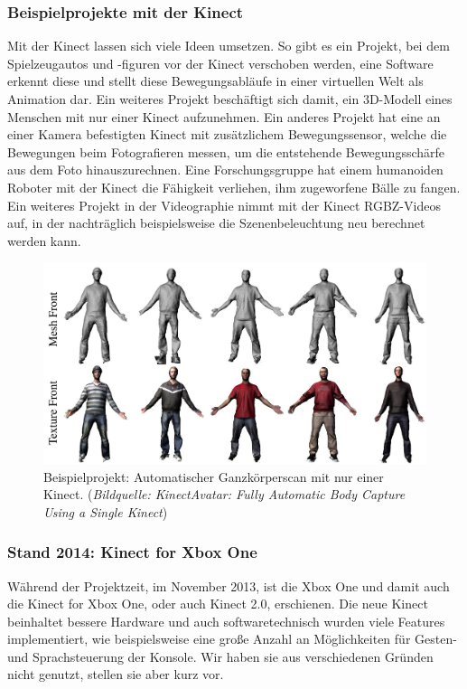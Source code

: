 \documentclass[12pt,a4paper,ngerman]{scrartcl}
\begin{document}
\subsubsection{Beispielprojekte mit der Kinect}

Mit der Kinect lassen sich viele Ideen umsetzen. So gibt es ein Projekt, bei dem Spielzeugautos und
-figuren vor der Kinect verschoben werden, eine Software erkennt diese und stellt diese Bewegungsabläufe
in einer virtuellen Welt als Animation dar.\cite{3dpuppetry} Ein weiteres Projekt beschäftigt sich
damit, ein 3D-Modell eines Menschen mit nur einer Kinect aufzunehmen.\cite{kinectavatar} Ein anderes Projekt hat eine an einer Kamera
befestigten Kinect mit zusätzlichem Bewegungssensor, welche die Bewegungen beim Fotografieren messen, um die
entstehende Bewegungsschärfe aus dem Foto hinauszurechnen.\cite{motiondeblurring} Eine Forschungsgruppe
hat einem humanoiden Roboter mit der Kinect die Fähigkeit verliehen, ihm zugeworfene Bälle zu fangen.\cite{kober}
Ein weiteres Projekt in der Videographie nimmt mit der Kinect RGBZ-Videos auf, in der nachträglich beispielsweise die
Szenenbeleuchtung neu berechnet werden kann.\cite{rgbzvideos}

\begin{figure}[H]
    \centering
    \includegraphics[scale=0.3]{img/kinectavatar.jpg}
    \caption{Beispielprojekt: Automatischer Ganzkörperscan mit nur einer Kinect. ({\em Bildquelle: KinectAvatar: Fully Automatic Body Capture Using a Single Kinect\cite{kinectavatar}})}
\end{figure}

\subsubsection{Stand 2014: Kinect for Xbox One}
Während der Projektzeit, im November 2013, ist die Xbox One und damit auch die Kinect for Xbox One, oder auch Kinect 2.0, erschienen.\cite{kinect2:verge} Die neue Kinect beinhaltet bessere Hardware und auch softwaretechnisch wurden viele Features implementiert, wie beispielsweise eine große Anzahl an Möglichkeiten für Gesten- und Sprachsteuerung der Konsole.\cite{kinect2:gesturevoice} Wir haben sie aus verschiedenen Gründen nicht genutzt, stellen sie aber kurz vor.
\end{document}
